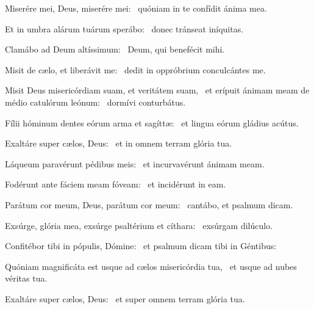 \item Miserére mei, Deus, miserére mei:~\psstar{} quóniam in te confídit ánima mea.

\item Et in umbra alárum tuárum sperábo:~\psstar{} donec tránseat iníquitas.

\item Clamábo ad Deum altíssi\-mum:~\psstar{} Deum, qui benefécit mihi.

\item Misit de cælo, et liberávit me:~\psstar{} dedit in oppróbrium conculcántes me.

\item Misit Deus misericórdiam suam, et veritátem suam,~\pscross{} et erípuit ánimam meam de médio catulórum leónum:~\psstar{} dormívi conturbátus.

\item Fílii hóminum dentes eórum arma et sagíttæ:~\psstar{} et lingua eórum gládius acútus.

\item Exaltáre super cælos, Deus:~\psstar{} et in omnem terram glória tua.

\item Láqueum paravérunt pédibus meis:~\psstar{} et incurvavérunt ánimam meam.

\item Fodérunt ante fáciem meam fóveam:~\psstar{} et incidérunt in eam.

\item Parátum cor meum, Deus, parátum cor meum:~\psstar{} cantábo, et psalmum dicam.

\item Exsúrge, glória mea, exsúrge psaltérium et cíthara:~\psstar{} exsúrgam dilúculo.

\item Confitébor tibi in pópulis, Dómine:~\psstar{} et psalmum dicam tibi in Géntibus:

\item Quóniam magnificáta est usque ad cælos misericórdia tua,~\psstar{} et usque ad nubes véritas tua.

\item Exaltáre super cælos, Deus:~\psstar{} et super omnem terram glória tua.

